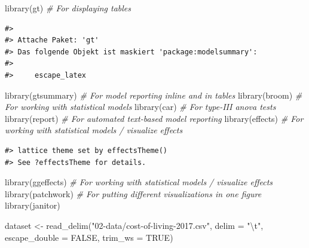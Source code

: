 \documentclass[
  11pt,
  a4paper,
  twoside]{scrbook}
\newenvironment{Shaded}{\begin{snugshade}}{\end{snugshade}}
\newcommand{\AttributeTok}[1]{\textcolor[rgb]{0.77,0.63,0.00}{#1}}
\newcommand{\CommentTok}[1]{\textcolor[rgb]{0.56,0.35,0.01}{\textit{#1}}}
\newcommand{\ConstantTok}[1]{\textcolor[rgb]{0.00,0.00,0.00}{#1}}
\newcommand{\FunctionTok}[1]{\textcolor[rgb]{0.00,0.00,0.00}{#1}}
\newcommand{\NormalTok}[1]{#1}
\newcommand{\OtherTok}[1]{\textcolor[rgb]{0.56,0.35,0.01}{#1}}
\newcommand{\SpecialCharTok}[1]{\textcolor[rgb]{0.00,0.00,0.00}{#1}}
\newcommand{\StringTok}[1]{\textcolor[rgb]{0.31,0.60,0.02}{#1}}
\begin{document}
\linespread{1}

\begin{Shaded}
\begin{Highlighting}[]
\FunctionTok{library}\NormalTok{(gt) }\CommentTok{\# For displaying tables}
\end{Highlighting}
\end{Shaded}

\linespread{1}

\begin{verbatim}
#> 
#> Attache Paket: 'gt'
#> Das folgende Objekt ist maskiert 'package:modelsummary':
#> 
#>     escape_latex
\end{verbatim}

\linespread{1}

\begin{Shaded}
\begin{Highlighting}[]
\FunctionTok{library}\NormalTok{(gtsummary) }\CommentTok{\# For model reporting inline and in tables}
\FunctionTok{library}\NormalTok{(broom) }\CommentTok{\# For working with statistical models}
\FunctionTok{library}\NormalTok{(car) }\CommentTok{\# For type{-}III anova tests}
\FunctionTok{library}\NormalTok{(report) }\CommentTok{\# For automated text{-}based model reporting}
\FunctionTok{library}\NormalTok{(effects) }\CommentTok{\# For working with statistical models / visualize effects}
\end{Highlighting}
\end{Shaded}

\linespread{1}

\begin{verbatim}
#> lattice theme set by effectsTheme()
#> See ?effectsTheme for details.
\end{verbatim}

\linespread{1}

\begin{Shaded}
\begin{Highlighting}[]
\FunctionTok{library}\NormalTok{(ggeffects) }\CommentTok{\# For working with statistical models / visualize effects}
\FunctionTok{library}\NormalTok{(patchwork) }\CommentTok{\# For putting different visualizations in one figure}
\FunctionTok{library}\NormalTok{(janitor)}

\NormalTok{dataset }\OtherTok{\textless{}{-}} \FunctionTok{read\_delim}\NormalTok{(}\StringTok{"02{-}data/cost{-}of{-}living{-}2017.csv"}\NormalTok{, }
                      \AttributeTok{delim =} \StringTok{"}\SpecialCharTok{\textbackslash{}t}\StringTok{"}\NormalTok{, }\AttributeTok{escape\_double =} \ConstantTok{FALSE}\NormalTok{, }
                      \AttributeTok{trim\_ws =} \ConstantTok{TRUE}\NormalTok{)}
\end{Highlighting}
\end{Shaded}
\end{document}
